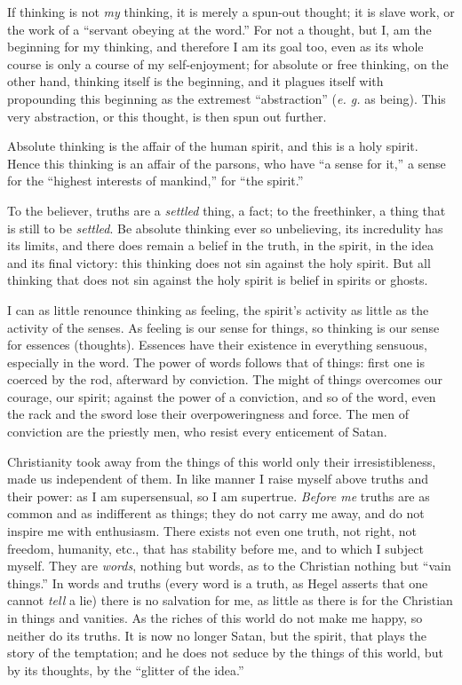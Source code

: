 \documentclass[12pt,a4paper]{book}
\begin{document}
If thinking is not \textit{my} thinking, it is merely a spun-out thought; it 
is slave work, or the work of a ``servant obeying at the word.'' For not a 
thought, but I, am the beginning for my thinking, and therefore I am its goal 
too, even as its whole course is only a course of my self-enjoyment; for 
absolute or free thinking, on the other hand, thinking itself is the 
beginning, and it plagues itself with propounding this beginning as the 
extremest ``abstraction'' (\textit{e. g.} as being). This very abstraction, 
or this thought, is then spun out further.

Absolute thinking is the affair of the human spirit, and this is a holy 
spirit. Hence this thinking is an affair of the parsons, who have ``a sense 
for it,'' a sense for the ``highest interests of mankind,'' for ``the 
spirit.''

To the believer, truths are a \textit{settled} thing, a fact; to the 
freethinker, a thing that is still to be \textit{settled}. Be absolute 
thinking ever so unbelieving, its incredulity has its limits, and there does 
remain a belief in the truth, in the spirit, in the idea and its final 
victory: this thinking does not sin against the holy spirit. But all thinking 
that does not sin against the holy spirit is belief in spirits or ghosts.

I can as little renounce thinking as feeling, the spirit's activity as little 
as the activity of the senses. As feeling is our sense for things, so thinking 
is our sense for essences (thoughts). Essences have their existence in 
everything sensuous, especially in the word. The power of words follows that 
of things: first one is coerced by the rod, afterward by conviction. The might 
of things overcomes our courage, our spirit; against the power of a 
conviction, and so of the word, even the rack and the sword lose their 
overpoweringness and force. The men of conviction are the priestly men, who 
resist every enticement of Satan.

Christianity took away from the things of this world only their 
irresistibleness, made us independent of them. In like manner I raise myself 
above truths and their power: as I am supersensual, so I am supertrue. 
\textit{Before me} truths are as common and as indifferent as things; they do 
not carry me away, and do not inspire me with enthusiasm. There exists not 
even one truth, not right, not freedom, humanity, etc., that has stability 
before me, and to which I subject myself. They are \textit{words}, nothing but 
words, as to the Christian nothing but ``vain things.'' In words and truths 
(every word is a truth, as Hegel asserts that one cannot \textit{tell} a lie) 
there is no salvation for me, as little as there is for the Christian in 
things and vanities. As the riches of this world do not make me happy, so 
neither do its truths. It is now no longer Satan, but the spirit, that plays 
the story of the temptation; and he does not seduce by the things of this 
world, but by its thoughts, by the ``glitter of the idea.''
\end{document}
